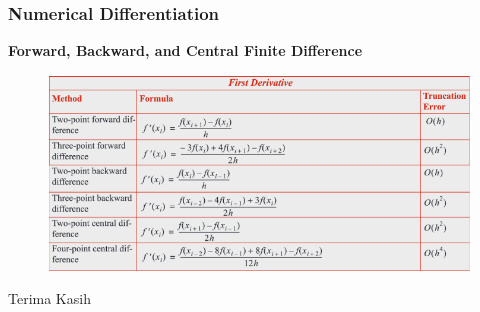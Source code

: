 \documentclass{beamer}
\begin{document}
\begin{frame}
\frametitle{Numerical Differentiation}
\textbf{Forward, Backward, and Central Finite Difference}
\begin{figure}
\centering
\includegraphics[scale=0.4]{table.png}
\end{figure}
\end{frame}
\begin{frame}
\Huge{\centerline{Terima Kasih}}
\end{frame}

\end{document}
